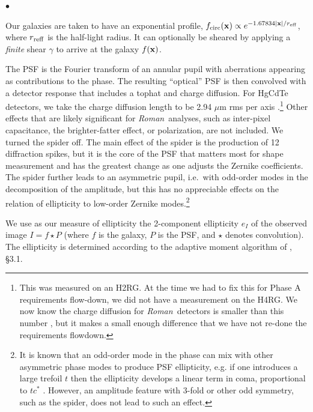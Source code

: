 \documentclass[usenatbib]{mnras}
\newcommand{\wfirst}{{\slshape Roman}}
\newcommand{\changetext}[1]{\textcolor{red}{#1}}
\begin{document}
\begin{list}{$\bullet$}{}
\item Our galaxies are taken to have an exponential profile, $f_{\rm circ}({\bf x}) \propto e^{-1.67834|{\bf x}|/r_{\rm eff}}$, where $r_{\rm reff}$ is the half-light radius. It can optionally be sheared by applying a {\em finite} shear $\gamma$ to arrive at the galaxy $f({\bf x})$.
\item The PSF is the Fourier transform of an
annular pupil with aberrations appearing as contributions to the
phase. The resulting ``optical'' PSF is then convolved with a detector
response that includes a tophat and charge diffusion. For HgCdTe
detectors, we take the charge diffusion length to be 2.94 $\mu$m rms
per axis \citep{2007PASP..119..466B}.\footnote{This was measured on an H2RG. At the time we had to fix this for Phase A requirements
flow-down, we did not have a measurement on the H4RG. We now know the charge diffusion for \wfirst\ detectors is smaller than this number \changetext{\citep{2020arXiv200500505M}}, but it makes a small enough difference that we have not re-done the requirements flowdown.} Other effects that are likely significant for \wfirst\ analyses, such as inter-pixel capacitance, the brighter-fatter effect, or polarization, are not included. We turned the spider off. The main effect of the spider is the production of 12 diffraction spikes, but it is the core of the PSF that matters most for shape measurement and has the greatest change as one adjusts the Zernike coefficients. The spider further leads to an asymmetric pupil, i.e.\ with odd-order modes in the decomposition of the amplitude, but this has no appreciable effects on the relation of ellipticity to low-order Zernike modes.\footnote{It is known that an odd-order mode in the phase can
mix with other asymmetric phase modes to produce PSF ellipticity,
e.g. if one introduces a large trefoil $t$ then the ellipticity
develops a linear term in coma, proportional to $tc^\ast$
\citep{2010SPIE.7731E..1EN}. However, an amplitude feature with 3-fold
or other odd symmetry, such as the spider, does not lead to such an
effect.}
\item We use as our measure of ellipticity the 2-component ellipticity $e_I$ of the observed image $I = f \star P$ (where $f$ is the galaxy, $P$ is the PSF, and $\star$ denotes convolution). The ellipticity is determined according to the adaptive moment algorithm of \cite{2002AJ....123..583B}, \S3.1.
\end{list}
\end{document}
